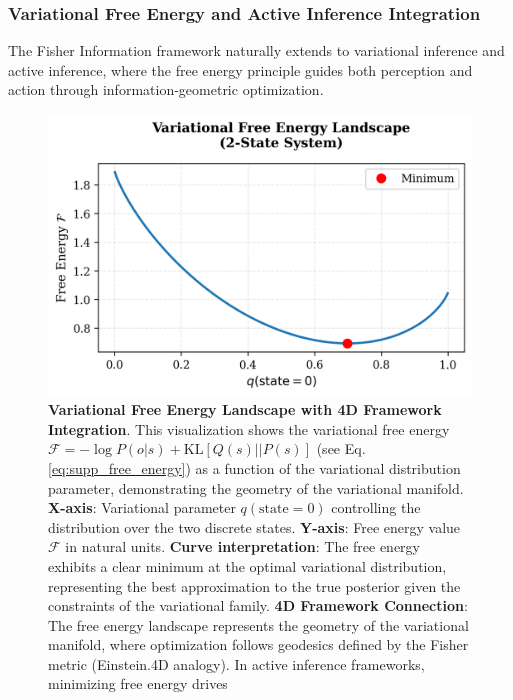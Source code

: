 \documentclass[
  10pt,
]{article}
\begin{document}
\hypertarget{variational-free-energy-and-active-inference-integration}{%
\subsubsection{Variational Free Energy and Active Inference
Integration}\label{variational-free-energy-and-active-inference-integration}}

The Fisher Information framework naturally extends to variational
inference and active inference, where the free energy principle guides
both perception and action through information-geometric optimization.

\begin{figure}
\centering
\includegraphics{../output/figures/free_energy_curve.png}
\caption{\textbf{Variational Free Energy Landscape with 4D Framework
Integration}. This visualization shows the variational free energy
\(\mathcal{F} = -\log P(o|s) + \text{KL}[Q(s)||P(s)]\) (see Eq.
\eqref{eq:supp_free_energy}) as a function of the variational
distribution parameter, demonstrating the geometry of the variational
manifold. \textbf{X-axis}: Variational parameter \(q(\text{state}=0)\)
controlling the distribution over the two discrete states.
\textbf{Y-axis}: Free energy value \(\mathcal{F}\) in natural units.
\textbf{Curve interpretation}: The free energy exhibits a clear minimum
at the optimal variational distribution, representing the best
approximation to the true posterior given the constraints of the
variational family. \textbf{4D Framework Connection}: The free energy
landscape represents the geometry of the variational manifold, where
optimization follows geodesics defined by the Fisher metric (Einstein.4D
analogy). In active inference frameworks, minimizing free energy drives
}
\end{figure}
\end{document}
